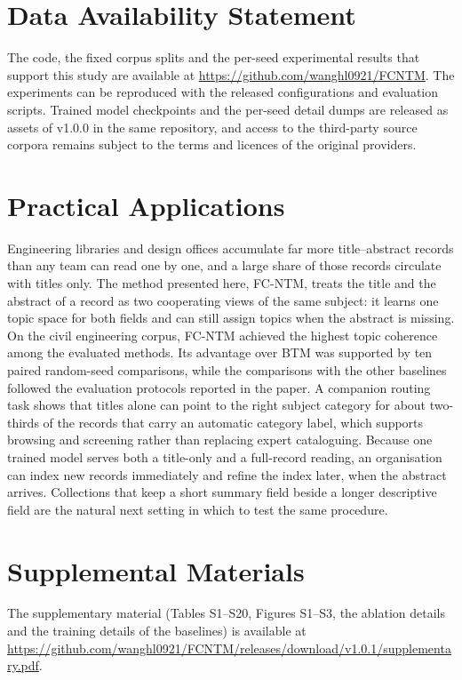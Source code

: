 \documentclass[Journal,letterpaper,NoLists]{ascelike-new}
\begin{document}
\section{Data Availability Statement}

The code, the fixed corpus splits and the per-seed experimental results that support this study are
available at \url{https://github.com/wanghl0921/FCNTM}. The experiments can be reproduced with the
released configurations and evaluation scripts. Trained model checkpoints and the per-seed detail
dumps are released as assets of v1.0.0 in the same repository, and access to the third-party source
corpora remains subject to the terms and licences of the original providers.

\section{Practical Applications}

Engineering libraries and design offices accumulate far more title--abstract records than any team
can read one by one, and a large share of those records circulate with titles only. The method
presented here, FC-NTM, treats the title and the abstract of a record as two cooperating views of
the same subject: it learns one topic space for both fields and can still assign topics when the
abstract is missing. On the civil engineering corpus, FC-NTM achieved the highest topic coherence
among the evaluated methods. Its advantage over BTM was supported by ten paired random-seed
comparisons, while the comparisons with the other baselines followed the evaluation protocols
reported in the paper. A companion routing task shows
that titles alone can point to the right subject category for about two-thirds of the records
that carry an automatic category label, which supports browsing and screening rather than
replacing expert cataloguing. Because one trained model serves both a title-only and a
full-record reading, an organisation can index new records immediately and refine the index
later, when the abstract arrives. Collections that keep a short summary field beside a longer
descriptive field are the natural next setting in which to test the same procedure.

\section{Supplemental Materials}

The supplementary material (Tables S1--S20, Figures S1--S3, the ablation details and the training
details of the baselines) is available at
\url{https://github.com/wanghl0921/FCNTM/releases/download/v1.0.1/supplementary.pdf}.
\end{document}
